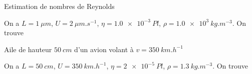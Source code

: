 \begin{exo}[PC][1][appli]{Estimation de nombres de Reynolds}

  \begin{corrige}
    On a $L = \SI{1}{\mu m}$, $U = \SI{2}{\mu m.s^{-1}}$, $\eta = \SI{1.0e-3}{Pl}$, $\rho = \SI{1.0e3}{kg.m^{-3}}$. On trouve
  \end{corrige}

  \begin{enonce}
  Aile de hauteur $\SI{50}{cm}$ d'un avion volant à $v=\SI{350}{km.h^{-1}}$
  \end{enonce}
% 
  
  \begin{corrige}
    On a $L = \SI{50}{cm}$, $U = \SI{350}{km.h^{-1}}$, $\eta = \SI{2e-5}{Pl}$, $\rho = \SI{1.3}{kg.m^{-3}}$. On trouve
  \end{corrige}
  
  
\end{exo}


